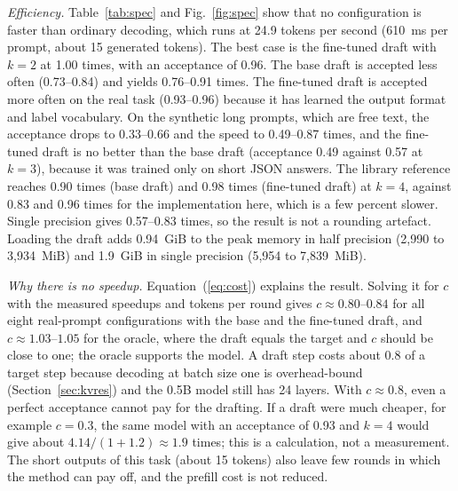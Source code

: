 \documentclass[conference]{IEEEtran}
\begin{document}
\emph{Efficiency.} Table~\ref{tab:spec} and Fig.~\ref{fig:spec} show that no configuration is faster than ordinary decoding, which runs at 24.9 tokens per second (610~ms per prompt, about 15 generated tokens). The best case is the fine-tuned draft with $k=2$ at 1.00 times, with an acceptance of 0.96. The base draft is accepted less often (0.73--0.84) and yields 0.76--0.91 times. The fine-tuned draft is accepted more often on the real task (0.93--0.96) because it has learned the output format and label vocabulary. On the synthetic long prompts, which are free text, the acceptance drops to 0.33--0.66 and the speed to 0.49--0.87 times, and the fine-tuned draft is no better than the base draft (acceptance 0.49 against 0.57 at $k=3$), because it was trained only on short JSON answers. The library reference reaches 0.90 times (base draft) and 0.98 times (fine-tuned draft) at $k=4$, against 0.83 and 0.96 times for the implementation here, which is a few percent slower. Single precision gives 0.57--0.83 times, so the result is not a rounding artefact. Loading the draft adds 0.94~GiB to the peak memory in half precision (2,990 to 3,934~MiB) and 1.9~GiB in single precision (5,954 to 7,839~MiB).

\emph{Why there is no speedup.} Equation~(\ref{eq:cost}) explains the result. Solving it for $c$ with the measured speedups and tokens per round gives $c\approx0.80$--$0.84$ for all eight real-prompt configurations with the base and the fine-tuned draft, and $c\approx1.03$--$1.05$ for the oracle, where the draft equals the target and $c$ should be close to one; the oracle supports the model. A draft step costs about 0.8 of a target step because decoding at batch size one is overhead-bound (Section~\ref{sec:kvres}) and the 0.5B model still has 24 layers. With $c\approx0.8$, even a perfect acceptance cannot pay for the drafting. If a draft were much cheaper, for example $c=0.3$, the same model with an acceptance of 0.93 and $k=4$ would give about $4.14/(1+1.2)\approx1.9$ times; this is a calculation, not a measurement. The short outputs of this task (about 15 tokens) also leave few rounds in which the method can pay off, and the prefill cost is not reduced.
\end{document}
